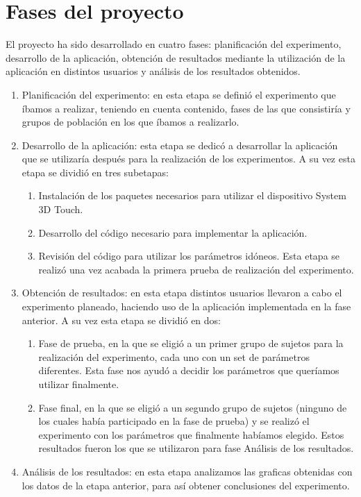 \documentclass[a4paper,11pt, oneside]{book}
\begin{document}
\section{Fases del proyecto}
El proyecto ha sido desarrollado en cuatro fases: planificación del experimento, desarrollo de la aplicación, obtención de resultados mediante la utilización de la aplicación en distintos usuarios y análisis de los resultados obtenidos. 
\begin{enumerate}
	\item Planificación del experimento: en esta etapa se definió el experimento que íbamos a realizar, teniendo en cuenta contenido, fases de las que consistiría y grupos de población en los que íbamos a realizarlo.
	\item Desarrollo de la aplicación: esta etapa se dedicó a desarrollar la aplicación que se utilizaría después para la realización de los experimentos. A su vez esta etapa se dividió en tres subetapas:
	\begin{enumerate}
		\item Instalación de los paquetes necesarios para utilizar el dispositivo System 3D Touch.
		\item Desarrollo del código necesario para implementar la aplicación.
		\item Revisión del código para utilizar los parámetros idóneos. Esta etapa se realizó una vez acabada la primera prueba de realización del experimento.
	\end{enumerate}
	\item Obtención de resultados: en esta etapa distintos usuarios llevaron a cabo el experimento planeado, haciendo uso de la aplicación implementada en la fase anterior.
	A su vez esta etapa se dividió en dos:
	\begin{enumerate}
		\item Fase de prueba, en la que se eligió a un primer grupo de sujetos para la realización del experimento, cada uno con un set de parámetros diferentes. Esta fase nos ayudó a decidir los parámetros que queríamos utilizar finalmente.
		\item Fase final, en la que se eligió a un segundo grupo de sujetos (ninguno de los cuales había participado en la fase de prueba) y se realizó el experimento con los parámetros que finalmente habíamos elegido.
		Estos resultados fueron los que se utilizaron para fase Análisis de los resultados.
	\end{enumerate}
		
	\item Análisis de los resultados: en esta etapa analizamos las graficas obtenidas con los datos de la etapa anterior, para así obtener conclusiones del experimento.
\end{enumerate}
\end{document}

